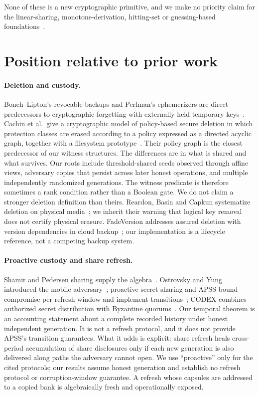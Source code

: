 \documentclass[pdflatex,sn-mathphys-num]{sn-jnl}
\theoremstyle{plain}
\theoremstyle{definition}
\begin{document}
None of these is a new cryptographic primitive, and we make no priority claim for the linear-sharing, monotone-derivation, hitting-set or guessing-based foundations~\cite{karchmer1993,panjwani2007}.

\section{Position relative to prior work}\label{sec:related}

\paragraph{Deletion and custody.}
Boneh--Lipton's revocable backups and Perlman's ephemerizers are direct predecessors to cryptographic forgetting with externally held temporary keys~\cite{boneh1996,perlman2007}. Cachin et al.\ give a cryptographic model of policy-based secure deletion in which protection classes are erased according to a policy expressed as a directed acyclic graph, together with a filesystem prototype~\cite{cachin2013}. Their policy graph is the closest predecessor of our witness structures. The differences are in what is shared and what survives. Our roots include threshold-shared seeds observed through affine views, adversary copies that persist across later honest operations, and multiple independently randomized generations. The witness predicate is therefore sometimes a rank condition rather than a Boolean gate. We do not claim a stronger deletion definition than theirs. Reardon, Basin and Capkun systematize deletion on physical media~\cite{reardon2013}; we inherit their warning that logical key removal does not certify physical erasure. FadeVersion addresses assured deletion with version dependencies in cloud backup~\cite{rahumed2011}; our implementation is a lifecycle reference, not a competing backup system.

\paragraph{Proactive custody and share refresh.}
Shamir and Pedersen sharing supply the algebra~\cite{shamir1979,pedersen1991}. Ostrovsky and Yung introduced the mobile adversary~\cite{ostrovsky1991}; proactive secret sharing and APSS bound compromise per refresh window and implement transitions~\cite{herzberg1995,zhou2005}; CODEX combines authorized secret distribution with Byzantine quorums~\cite{marsh2004}. Our temporal theorem is an accounting statement about a complete recorded history under honest independent generation. It is not a refresh protocol, and it does not provide APSS's transition guarantees. What it adds is explicit: share refresh heals cross-period accumulation of share disclosures only if each new generation is also delivered along paths the adversary cannot open. We use ``proactive'' only for the cited protocols; our results assume honest generation and establish no refresh protocol or corruption-window guarantee. A refresh whose capsules are addressed to a copied bank is algebraically fresh and operationally exposed.
\end{document}

